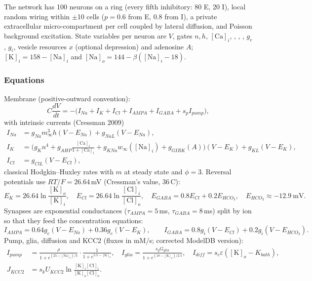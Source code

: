 The network has 100 neurons on a ring (every fifth inhibitory: 80 E, 20 I), local random wiring within $\pm$10 cells ($p=0.6$ from E, $0.8$ from I), a private extracellular micro-compartment per cell coupled by lateral \Kp{} diffusion, and Poisson background excitation. State variables per neuron are $V$, gates $n,h$, $[\mathrm{Ca}]_i$, \Ko, \Nai, \Cli, $g_e$, $g_i$, vesicle resources $x$ (optional depression) and adenosine $A$; $[\mathrm{K}]_i = 158-[\mathrm{Na}]_i$ and $[\mathrm{Na}]_o = 144-\beta([\mathrm{Na}]_i-18)$.

\subsubsection{Equations}

Membrane (positive-outward convention):
\begin{equation}
C\frac{dV}{dt} = -\big(I_{Na} + I_K + I_{Cl} + I_{AMPA} + I_{GABA} + s_p I_{pump}\big),
\end{equation}
with intrinsic currents (Cressman 2009)
\begin{align}
I_{Na} &= g_{Na} m_\infty^3 h (V-E_{Na}) + g_{NaL}(V-E_{Na}),\\
I_K &= \Big(g_K n^4 + g_{AHP}\tfrac{[\mathrm{Ca}]_i}{1+[\mathrm{Ca}]_i} + g_{KNa}w_\infty([\mathrm{Na}]_i) + g_{GIRK}(A)\Big)(V-E_K) + g_{KL}(V-E_K),\\
I_{Cl} &= g_{ClL}(V-E_{Cl}),
\end{align}
classical Hodgkin--Huxley rates with $m$ at steady state and $\phi=3$. Reversal potentials use $RT/F=26.64$\,mV (Cressman's value, 36\,\textdegree C):
\begin{equation}
E_K = 26.64\ln\frac{[\mathrm{K}]_o}{[\mathrm{K}]_i},\quad
E_{Cl} = 26.64\ln\frac{[\mathrm{Cl}]_i}{[\mathrm{Cl}]_o},\quad
E_{GABA} = 0.8E_{Cl} + 0.2E_{HCO_3},\quad E_{HCO_3}\approx-12.9\ \mathrm{mV}.
\end{equation}
Synapses are exponential conductances ($\tau_{AMPA}=5$\,ms, $\tau_{GABA}=8$\,ms) split by ion so that they feed the concentration equations:
\begin{equation}
I_{AMPA} = 0.64g_e(V-E_{Na}) + 0.36g_e(V-E_K),\qquad I_{GABA} = 0.8g_i(V-E_{Cl}) + 0.2g_i(V-E_{HCO_3}).
\end{equation}
Pump, glia, diffusion and KCC2 (fluxes in mM/s; corrected ModelDB version):
\begin{align}
I_{pump} &= \frac{\rho}{1+e^{(25-[\mathrm{Na}]_i)/3}}\cdot\frac{1}{1+e^{5.5-[\mathrm{K}]_o}},\quad
I_{glia} = \frac{s_g G_{glia}}{1+e^{(18-[\mathrm{K}]_o)/2.5}},\quad
I_{diff} = s_c\varepsilon([\mathrm{K}]_o - K_{bath}),\\
J_{KCC2} &= s_k U_{KCC2}\ln\frac{[\mathrm{K}]_i[\mathrm{Cl}]_i}{[\mathrm{K}]_o[\mathrm{Cl}]_o}.
\end{align}
